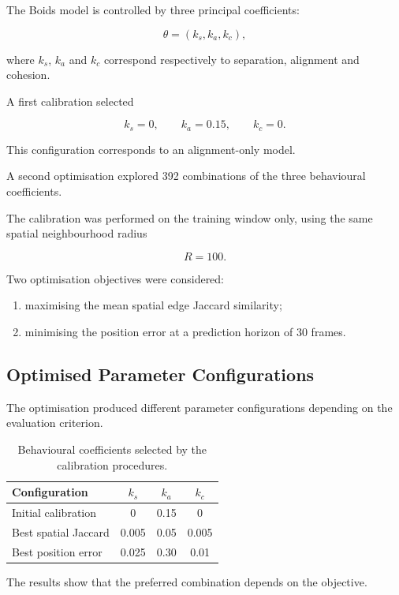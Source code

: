 \documentclass[10pt,a4paper]{article}
\begin{document}
The Boids model is controlled by
three principal coefficients:

\[
\theta=(k_s,k_a,k_c),
\]

where $k_s$, $k_a$ and $k_c$ correspond
respectively to separation, alignment
and cohesion.

A first calibration selected

\[
\boxed{
k_s=0,\qquad
k_a=0.15,\qquad
k_c=0.
}
\]

This configuration corresponds
to an alignment-only model.

A second optimisation explored
392 combinations of the three
behavioural coefficients.

The calibration was performed
on the training window only,
using the same spatial neighbourhood
radius

\[
R=100.
\]

Two optimisation objectives
were considered:

\begin{enumerate}
    \item maximising the mean spatial
    edge Jaccard similarity;

    \item minimising the position error
    at a prediction horizon of 30 frames.
\end{enumerate}

\subsection{Optimised Parameter Configurations}

The optimisation produced different
parameter configurations depending
on the evaluation criterion.

\begin{table}[htbp]
\centering
\small
\begin{tabular}{lccc}
\toprule
\textbf{Configuration}
& $k_s$ & $k_a$ & $k_c$\\
\midrule
Initial calibration
& 0 & 0.15 & 0\\
Best spatial Jaccard
& 0.005 & 0.05 & 0.005\\
Best position error
& 0.025 & 0.30 & 0.01\\
\bottomrule
\end{tabular}
\caption{
Behavioural coefficients selected
by the calibration procedures.
}
\label{tab:app-boids-parameters}
\end{table}

The results show that the preferred
combination depends on the objective.
\end{document}
